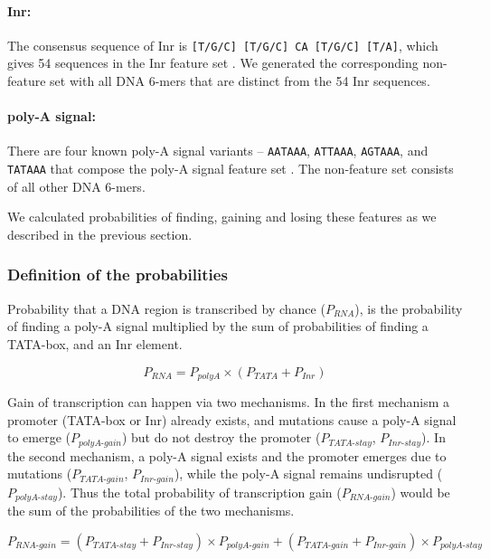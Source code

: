 \documentclass[12pt,a4paper]{article}
\begin{document}
\paragraph{Inr:} The consensus sequence of Inr is \texttt{[T/G/C] [T/G/C] CA [T/G/C] [T/A]}, which gives 54 sequences in the Inr feature set \citep{Inr}. We generated the corresponding non-feature set with all DNA 6-mers that are distinct from the 54 Inr sequences.

\paragraph{poly-A signal:} There are four known poly-A signal variants -- \texttt{AATAAA}, \texttt{ATTAAA}, \texttt{AGTAAA}, and \texttt{TATAAA} that compose the poly-A signal feature set \citep{polyA}. The non-feature set consists of all other DNA 6-mers.

\vspace{1\baselineskip}

We calculated probabilities of finding, gaining and losing these features as we described in the previous section.

\subsubsection{Definition of the probabilities}

Probability that a DNA region is transcribed by chance ($P_\textit{RNA}$), is the probability of finding a poly-A signal multiplied by the sum of probabilities of finding a TATA-box, and an Inr element. 

\begin{equation}
P_\textit{RNA} = P_\textit{polyA} \times (P_\textit{TATA} + P_\textit{Inr})
\label{eqrnaprob}
\end{equation}

Gain of transcription can happen via two mechanisms. In the first mechanism a promoter (TATA-box or Inr) already exists, and mutations cause a poly-A signal to emerge ($P_\textit{polyA-gain}$) but do not destroy the promoter ($P_\textit{TATA-stay}$,  $P_\textit{Inr-stay}$). In the second mechanism, a poly-A signal exists and the promoter emerges due to mutations ($P_\textit{TATA-gain}$,  $P_\textit{Inr-gain}$), while the poly-A signal remains undisrupted ($P_\textit{polyA-stay}$). Thus the total probability of transcription gain ($P_\textit{RNA-gain}$) would be the sum of the probabilities of the two mechanisms.

\begin{equation}
P_\textit{RNA-gain} = (P_\textit{TATA-stay} + P_\textit{Inr-stay})\times P_\textit{polyA-gain} + (P_\textit{TATA-gain} + P_\textit{Inr-gain})\times P_\textit{polyA-stay}
\label{eqrnagain}
\end{equation}
\end{document}
